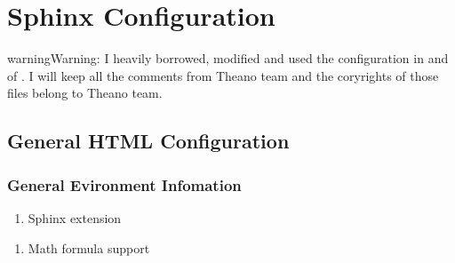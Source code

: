 \documentclass[letterpaper,12pt,english]{sphinxmanual}
\begin{document}
\chapter{Sphinx Configuration}
\label{\detokenize{sphinx:sphinx-configuration}}\label{\detokenize{sphinx:sphinx}}\label{\detokenize{sphinx::doc}}
\begin{sphinxadmonition}{warning}{Warning:}
I heavily borrowed, modified and used the configuration in  and  of . I will keep all the comments from Theano team and the coryrights of those files belong to Theano team.
\end{sphinxadmonition}


\section{General HTML Configuration}
\label{\detokenize{sphinx:general-html-configuration}}

\subsection{General Evironment Infomation}
\label{\detokenize{sphinx:general-evironment-infomation}}\begin{enumerate}
\def\theenumi{\arabic{enumi}}
\def\labelenumi{\theenumi .}
\makeatletter\def\p@enumii{\p@enumi \theenumi .}\makeatother
\item {} 
Sphinx extension

\end{enumerate}

\begin{sphinxVerbatim}[commandchars=\\\{\}]
  \PYG{p}{[}
              \PYG{p}{]}

  
  
  
\end{sphinxVerbatim}
\begin{enumerate}
\def\theenumi{\arabic{enumi}}
\def\labelenumi{\theenumi .}
\makeatletter\def\p@enumii{\p@enumi \theenumi .}\makeatother
\setcounter{enumi}{1}
\item {} 
Math formula support

\end{enumerate}
\end{document}
